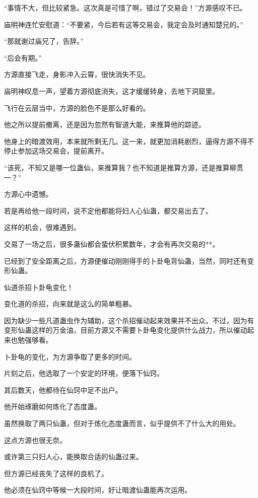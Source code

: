 \begin{this_body}
“事情不大，但比较紧急。这次真是可惜了啊，错过了交易会！”方源感叹不已。

庙明神连忙安慰道：“不要紧，今后若有这等交易会，我定会及时通知楚兄的。”

“那就谢过庙兄了，告辞。”

“后会有期。”

方源直接飞走，身影冲入云霄，很快消失不见。

庙明神叹息一声，望着方源彻底消失，这才缓缓转身，去地下洞窟里。

飞行在云层当中，方源的脸色不是那么好看的。

他之所以提前撤离，还是因为忽然有智道大能，来推算他的踪迹。

他身上的暗渡效用，本来就所剩无几。这一来，就更加消耗剧烈，逼得方源不得不停止参加这场交易会，提前离开。

“该死，不知又是哪一位蛊仙，来推算我？也不知道是推算方源，还是推算柳贯一？”

方源心中遗憾。

若是再给他一段时间，说不定他都能将妇人心仙蛊，都交易出去了。

这样的机会，很难遇到。

交易了一场之后，很多蛊仙都会蛰伏积累数年，才会有再次交易的**。

已经到了安全距离之后，方源便催动刚刚得手的卜卦龟背仙蛊，当然，同时还有变形仙蛊。

仙道杀招卜卦龟变化！

变化道的杀招，向来就是这么的简单粗暴。

因为缺少一些凡道蛊虫作为辅助，这个杀招催动起来效果并不出众。不过，因为有变形仙蛊这样的万金油，目前方源又不需要卜卦龟变化提供什么战力，所以催动起来也勉强够看。

卜卦龟的变化，为方源争取了更多的时间。

片刻之后，他选取了一个安定的环境，便落下仙窍。

其后数天，他都待在仙窍中足不出户。

他开始琢磨如何炼化了态度蛊。

虽然换取了两只仙蛊，但对于炼化态度蛊而言，似乎提供不了什么大的用处。

这点方源也很无奈。

或许第三只妇人心，能换取合适的仙蛊过来。

但方源已经丧失了这样的良机了。

他必须在仙窍中等候一大段时间，好让暗渡仙蛊能再次运用。


\end{this_body}
